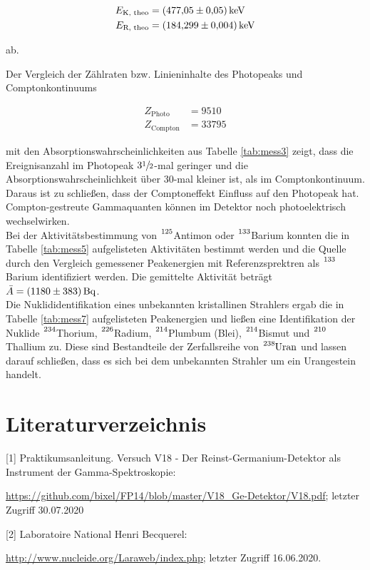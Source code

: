 \begin{align*}
    E_\text{K, theo} &= \SI{477.05 +- 0.05}{\kilo\eV} \\
    E_\text{R, theo} &= \SI{184.299 +- 0.004}{\kilo\eV}
\end{align*}

ab.

Der Vergleich der Zählraten bzw. Linieninhalte des Photopeaks und Comptonkontinuums

\begin{align*}
    Z_\text{Photo} &= \num{9510} \\
    Z_\text{Compton} &= \num{33795}
\end{align*}

mit den Absorptionswahrscheinlichkeiten aus Tabelle \ref{tab:mess3} zeigt, dass die Ereignisanzahl im Photopeak 
$3 \sfrac{1}{2}$-mal geringer und die Absorptionswahrscheinlichkeit über $30$-mal kleiner ist, als im Comptonkontinuum.
Daraus ist zu schließen, dass der Comptoneffekt Einfluss auf den Photopeak hat. Compton-gestreute Gammaquanten können im 
Detektor noch photoelektrisch wechselwirken.\\

Bei der Aktivitätsbestimmung von  $\ce{^{125}}$Antimon oder  $\ce{^{133}}$Barium konnten
die in Tabelle \ref{tab:mess5} aufgelisteten Aktivitäten bestimmt werden und die Quelle durch den
Vergleich gemessener Peakenergien mit Referenzsprektren als $\ce{^{133}}$Barium identifiziert werden.
Die gemittelte Aktivität beträgt $\bar{A} = \SI{1180 +- 383}{\becquerel}$.\\

Die Nuklididentifikation eines unbekannten kristallinen Strahlers ergab die in Tabelle \ref{tab:mess7}
aufgelisteten Peakenergien und ließen eine Identifikation der Nuklide 
$\ce{^{234}}$Thorium, $\ce{^{226}}$Radium, $\ce{^{214}}$Plumbum (Blei), $\ce{^{214}}$Bismut und
$\ce{^{210}}$Thallium zu. Diese sind Bestandteile der Zerfallsreihe von $\ce{^{238}Uran}$ und lassen
darauf schließen, dass es sich bei dem unbekannten Strahler um ein Urangestein handelt.


\section{Literaturverzeichnis}
\label{sec:Literaturverzeichnis}

[1] Praktikumsanleitung. Versuch V18 - Der Reinst-Germanium-Detektor als Instrument
der Gamma-Spektroskopie:

\url{https://github.com/bixel/FP14/blob/master/V18_Ge-Detektor/V18.pdf}; letzter Zugriff 30.07.2020

[2] Laboratoire National Henri Becquerel:

\url{http://www.nucleide.org/Laraweb/index.php}; letzter Zugriff 16.06.2020.
